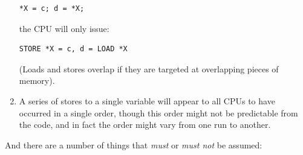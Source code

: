 \begin{enumerate}
\begin{minipage}[t]{\columnwidth}
\scriptsize
\begin{verbatim}
*X = c; d = *X;
\end{verbatim}
\end{minipage}

	the CPU will only issue:

\begin{minipage}[t]{\columnwidth}
\scriptsize
\begin{verbatim}
STORE *X = c, d = LOAD *X
\end{verbatim}
\end{minipage}

	(Loads and stores overlap if they are targeted at overlapping pieces of
	memory).
\item	A series of stores to a single variable will appear to all
	CPUs to have occurred in a single order, though this order
	might not be predictable from the code, and in fact the
	order might vary from one run to another.
\end{enumerate}

And there are a number of things that \emph{must} or \emph{must not} be assumed:

